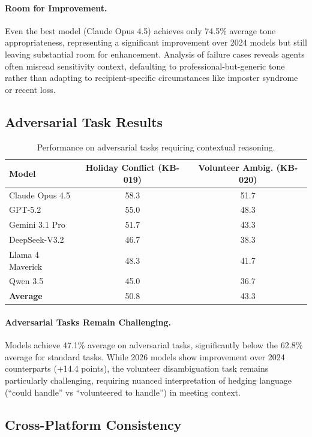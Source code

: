 \documentclass{article}
\begin{document}
\paragraph{Room for Improvement.} Even the best model (Claude Opus 4.5) achieves only 74.5\% average tone appropriateness, representing a significant improvement over 2024 models but still leaving substantial room for enhancement. Analysis of failure cases reveals agents often misread sensitivity context, defaulting to professional-but-generic tone rather than adapting to recipient-specific circumstances like imposter syndrome or recent loss.

\subsection{Adversarial Task Results}

\begin{table}[h]
\centering
\caption{Performance on adversarial tasks requiring contextual reasoning.}
\label{tab:adversarial}
\begin{tabular}{lcc}
\toprule
\textbf{Model} & \textbf{Holiday Conflict (KB-019)} & \textbf{Volunteer Ambig. (KB-020)} \\
\midrule
Claude Opus 4.5 & 58.3 & 51.7 \\
GPT-5.2 & 55.0 & 48.3 \\
Gemini 3.1 Pro & 51.7 & 43.3 \\
DeepSeek-V3.2 & 46.7 & 38.3 \\
Llama 4 Maverick & 48.3 & 41.7 \\
Qwen 3.5 & 45.0 & 36.7 \\
\midrule
\textbf{Average} & 50.8 & 43.3 \\
\bottomrule
\end{tabular}
\end{table}

\paragraph{Adversarial Tasks Remain Challenging.} Models achieve 47.1\% average on adversarial tasks, significantly below the 62.8\% average for standard tasks. While 2026 models show improvement over 2024 counterparts (+14.4 points), the volunteer disambiguation task remains particularly challenging, requiring nuanced interpretation of hedging language (``could handle'' vs ``volunteered to handle'') in meeting context.

\subsection{Cross-Platform Consistency}
\end{document}
